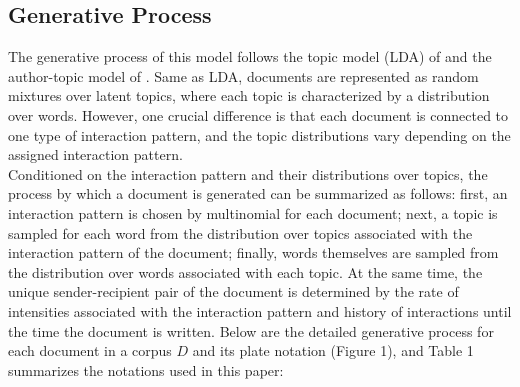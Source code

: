 \documentclass[a4paper]{article}
\begin{document}
\subsection{Generative Process}
The generative process of this model follows the topic model (LDA) of \cite{Blei2003} and the author-topic model of \cite{rosen2004author}. Same as LDA, documents are represented as random mixtures over latent topics, where each topic is characterized by a distribution over words. However, one crucial difference is that each document is connected to one type of interaction pattern, and the topic distributions vary depending on the assigned interaction pattern. \\ \newline Conditioned on the interaction pattern and their distributions over topics, the process by which a document is generated can be summarized as follows: first, an interaction pattern is chosen by multinomial for each document; next, a topic is sampled for each word from the distribution over topics associated with the interaction pattern of the document; finally, words themselves are sampled from the distribution over words associated with each topic. At the same time, the unique sender-recipient pair of the document is determined by the rate of intensities associated with the interaction pattern and history of interactions until the time the document is written. Below are the detailed generative process for each document in a corpus $D$ and its plate notation (Figure 1), and Table 1 summarizes the notations used in this paper:
\end{document}
